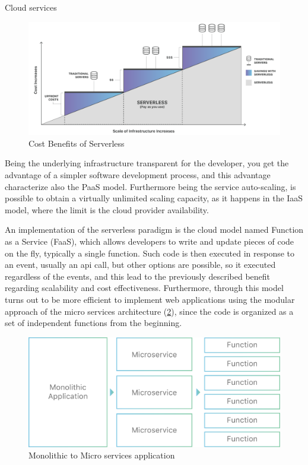 \begin{chapter}{Cloud services}
    \begin{figure}
        \centering
        \includegraphics[width=\linewidth]{source/images/benefits-of-serverless.png}
        \caption{Cost Benefits of Serverless}
        \label{fig:serverless_benefits}
    \end{figure}

    Being the underlying infrastructure transparent for the developer, you get the advantage
    of a simpler software development process, and this advantage characterize also
    the PaaS model. Furthermore being the service auto-scaling, is possible to obtain
    a virtually unlimited scaling capacity, as it happens in the IaaS model, where the
    limit is the cloud provider availability.

    An implementation of the serverless paradigm is the cloud model named Function
    as a Service (FaaS), which allows developers to write and update pieces of code
    on the fly, typically a single function.
    Such code is then executed in response to an event, usually an api call, but other
    options are possible, so it executed regardless of the events, and this lead to
    the previously described benefit regarding scalability and cost effectiveness.
    Furthermore, through this model turns out to be more efficient to implement web
    applications using the modular approach of the micro services architecture
    (\ref{fig:monolithic_to_microservices}), since the code is organized as a set of
    independent functions from the beginning.

    \begin{figure}
        \centering
        \includegraphics[width=\linewidth]{source/images/monolithic-application-microservice-faas.png}
        \caption{Monolithic to Micro services application}
        \label{fig:monolithic_to_microservices}
    \end{figure}


\end{chapter}
